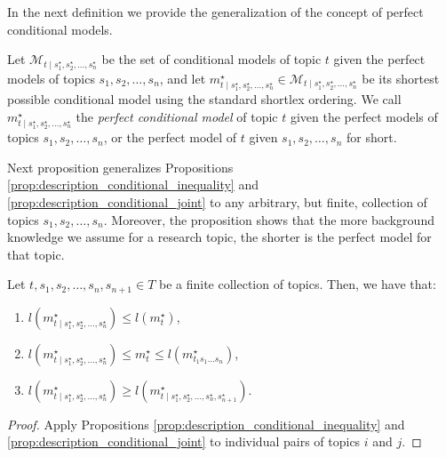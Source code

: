 In the next definition we provide the generalization of the concept of perfect conditional models.

\begin{definition}
Let $\mathcal{M}_{t \mid s_1^\star, s_2^\star, \ldots, s_n^\star}$ be the set of conditional models of topic $t$ given the perfect models of topics $s_1, s_2, \ldots, s_n$, and let $m_{t \mid s_1^\star, s_2^\star, \ldots, s_n^\star}^\star \in \mathcal{M}_{t \mid s_1^\star, s_2^\star, \ldots, s_n^\star}$ be its shortest possible conditional model using the standard shortlex ordering. We call $m_{t \mid s_1^\star, s_2^\star, \ldots, s_n^\star}^\star$ the \emph{perfect conditional model} of topic $t$ given the perfect models of topics $s_1, s_2, \ldots, s_n$, or the perfect model of $t$ given $s_1, s_2, \ldots, s_n$ for short.
\end{definition}

Next proposition generalizes Propositions \ref{prop:description_conditional_inequality} and \ref{prop:description_conditional_joint} to any arbitrary, but finite, collection of topics $s_1, s_2, \ldots, s_n$. Moreover, the proposition shows that the more background knowledge we assume for a research topic, the shorter is the perfect model for that topic.

\begin{proposition}
\label{prop:joint_multiple_topics}
Let $t, s_1, s_2, \ldots, s_n, s_{n+1} \in T$ be a finite collection of topics. Then, we have that:

\renewcommand{\theenumi}{\roman{enumi}}
\begin{enumerate}
\item $l \left( m_{t \mid s_1^\star, s_2^\star, \ldots, s_n^\star}^\star \right) \leq l \left( m^\star_t \right)$,
\item $l \left( m_{t \mid s_1^\star, s_2^\star, \ldots, s_n^\star}^\star \right) \leq m_t^\star \leq l(m_{t_1 s_1 \ldots s_n}^\star)$,
\item $l \left( m_{t \mid s_1^\star, s_2^\star, \ldots, s_n^\star}^\star \right) \geq l \left( m_{t \mid s_1^\star, s_2^\star, \ldots, s_n^\star, s_{n+1}^\star}^\star \right)$.
\end{enumerate}
\end{proposition}
\begin{proof}
Apply Propositions \ref{prop:description_conditional_inequality} and \ref{prop:description_conditional_joint} to individual pairs of topics $i$ and $j$.
\end{proof}


